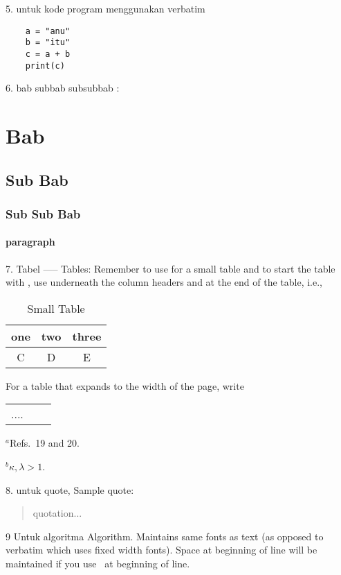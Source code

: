 5. 	untuk kode program menggunakan verbatim
	\begin{verbatim}
	a = "anu"
	b = "itu"
	c = a + b
	print(c) 
	\end{verbatim}	
6. bab subbab subsubbab :
	\section{Bab}
	\subsection{Sub Bab}
	\subsubsection{Sub Sub Bab}
	\paragraph{paragraph}

7. Tabel 
-----
Tables:
 Remember to use \centering for a small table and to start the table
 with \hline, use \hline underneath the column headers and at the end of 
 the table, i.e.,

\begin{table}[h]
\caption{Small Table}
\centering
\begin{tabular}{ccc}
\hline
one&two&three\\
\hline
C&D&E\\
\hline
\end{tabular}
\end{table}

For a table that expands to the width of the page, write

\begin{table}
\begin{tabular*}{\textwidth}{@{\extracolsep{\fill}}lcc}
\hline
....
\end{tabular*}
\begin{tablenotes}
$^a$Refs.~19 and 20.

$^b\kappa, \lambda>1$.
\end{tablenotes}
\end{table}


8. untuk quote, Sample quote:
\begin{quote}
quotation...
\end{quote}

9 Untuk algoritma
Algorithm.
Maintains same fonts as text (as opposed to verbatim which uses fixed
width fonts). Space at beginning of line will be maintained if you
use \ at beginning of line.

